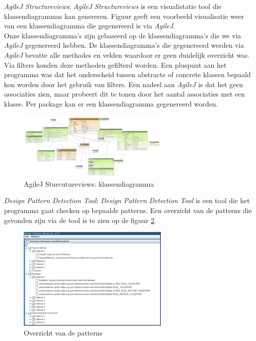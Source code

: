 \documentclass[i1]{oss}
\begin{document}
\begin{description}
\item \emph{AgileJ Structureviews}: \emph{AgileJ Structureviews} is een visualistatie tool die klassendiagrammas kan genereren. Figuur \label{fig:AgileJklassendia} geeft een voorbeeld visualisatie weer van een klassendiagramma die gegenereerd is via \emph{AgileJ}.\\
Onze klassendiagramma's zijn gebaseerd op de klassendiagramma's die we via \emph{AgileJ} gegenereerd hebben. De klassendiagramma's die gegenereerd werden via \emph{AgileJ} bevatte alle methodes en velden waardoor er geen duidelijk overzicht was. Via filters konden deze methoden gefilterd worden. Een pluspunt aan het programma was dat het onderscheid tussen abstracte of concrete klassen bepaald kon worden door het gebruik van filters.  Een nadeel aan \emph{AgileJ} is dat het geen associaties zien, maar probeert dit te tonen door het aantal associaties met een klasse. Per package kan er een klassendiagramma gegenereerd worden. 


\begin{figure}[h!]
	\centering
	\includegraphics[width=0.65\textwidth]{AgileJKlassendiagramma}
	\caption{AgileJ Sturcutureviews: klassendiagramma}
	\label{fig:AgileJKlassendia}
\end{figure}

\item \emph{Design Pattern Detection Tool}: \emph{Design Pattern Detection Tool} is een tool die het programma gaat checken op bepaalde patterns. Een overzicht van de patterns die gevonden zijn via de tool is te zien op de figuur \ref{fig:DesignPatterns}. 

\begin{figure}[h!]
	\centering
	\includegraphics[width=0.65\textwidth]{Patterns1}
	\caption{Overzicht van de patterns}
	\label{fig:DesignPatterns}
\end{figure}


\end{description}
\end{document}
